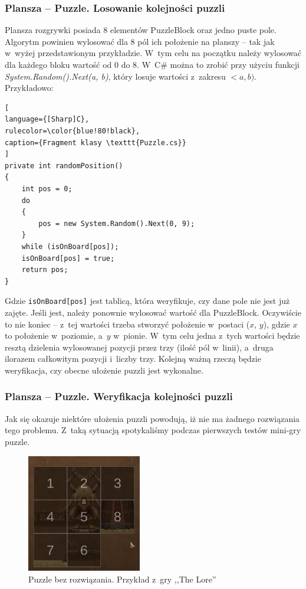 \documentclass[oneside,polski,logo]{amuthesis}
\begin{document}
\subsubsection{Plansza – Puzzle. Losowanie kolejności puzzli}
\par Plansza rozgrywki posiada 8 elementów PuzzleBlock oraz jedno puste pole.  Algorytm powinien wylosować dla 8 pól ich położenie na planszy – tak jak w~wyżej przedstawionym przykładzie. W~tym celu na początku należy wylosować dla każdego bloku wartość od 0 do 8. W~C\# można to zrobić przy użyciu funkcji  \emph{System.Random().Next(a, b)}, który losuje wartości z~zakresu \(<a, b)\). Przykładowo:
\begin{lstlisting}[
language={[Sharp]C},
rulecolor=\color{blue!80!black},
caption={Fragment klasy \texttt{Puzzle.cs}}
]
private int randomPosition()
{
    int pos = 0;
    do
    {
        pos = new System.Random().Next(0, 9);
    }
    while (isOnBoard[pos]);
    isOnBoard[pos] = true;
    return pos;
}
\end{lstlisting}

Gdzie \texttt{isOnBoard[pos]} jest tablicą, która weryfikuje, czy dane pole nie jest już zajęte. Jeśli jest, należy ponownie wylosować wartość dla PuzzleBlock. Oczywiście to nie koniec – z~tej wartości trzeba stworzyć położenie w~postaci (\(x\), \(y\)), gdzie \(x\) to położenie w~poziomie, a~\(y\) w~pionie. W~tym celu jedna z~tych wartości będzie resztą dzielenia wylosowanej pozycji przez trzy (ilość pól w~linii), a~druga ilorazem całkowitym pozycji i~liczby trzy. 
Kolejną ważną rzeczą będzie weryfikacja, czy obecne ułożenie puzzli jest wykonalne.

\subsubsection{Plansza – Puzzle. Weryfikacja kolejności puzzli}
\par Jak się okazuje niektóre ułożenia puzzli powodują, iż nie ma żadnego rozwiązania tego problemu. Z~taką sytuacją spotykaliśmy podczas pierwszych testów mini-gry puzzle. 
\begin{figure}[h]
	\centering
	\includegraphics[width=5cm]{images/tyrek/puzzle_1.png}
	\caption{Puzzle bez rozwiązania. Przykład z~gry ,,The Lore''}
\end{figure}
\end{document}
